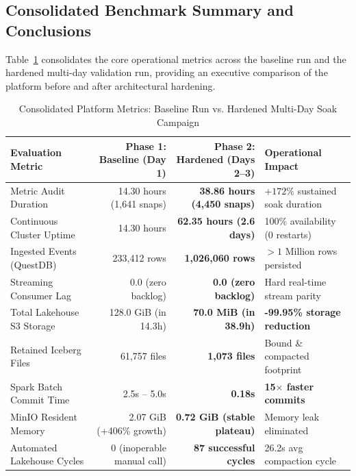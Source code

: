 \subsection{Consolidated Benchmark Summary and Conclusions}
\label{subsec:eval_summary}

Table~\ref{tab:pipeline_consolidated_summary} consolidates the core operational metrics across the baseline run and the hardened multi-day validation run, providing an executive comparison of the platform before and after architectural hardening.

\begin{table}[htbp]
\centering
\small
\caption{Consolidated Platform Metrics: Baseline Run vs. Hardened Multi-Day Soak Campaign}
\label{tab:pipeline_consolidated_summary}
\vspace{0.2cm}
\begin{tabular}{l r r l}
\toprule
\textbf{Evaluation Metric} & \textbf{Phase 1: Baseline (Day 1)} & \textbf{Phase 2: Hardened (Days 2--3)} & \textbf{Operational Impact} \\
\midrule
Metric Audit Duration      & 14.30 hours (1,641 snaps)  & \textbf{38.86 hours (4,450 snaps)}  & $+172\%$ sustained soak duration \\
Continuous Cluster Uptime  & 14.30 hours                & \textbf{62.35 hours (2.6 days)}    & 100\% availability (0 restarts) \\
Ingested Events (QuestDB)  & 233,412 rows               & \textbf{1,026,060 rows}            & $> 1$ Million rows persisted \\
Streaming Consumer Lag     & 0.0 (zero backlog)         & \textbf{0.0 (zero backlog)}        & Hard real-time stream parity \\
Total Lakehouse S3 Storage & 128.0 GiB (in 14.3h)       & \textbf{70.0 MiB (in 38.9h)}       & \textbf{-99.95\% storage reduction} \\
Retained Iceberg Files     & 61,757 files               & \textbf{1,073 files}               & Bound \& compacted footprint \\
Spark Batch Commit Time    & 2.5s -- 5.0s               & \textbf{0.18s}                     & \textbf{15$\times$ faster commits} \\
MinIO Resident Memory      & 2.07 GiB (+406\% growth)   & \textbf{0.72 GiB (stable plateau)} & Memory leak eliminated \\
Automated Lakehouse Cycles & 0 (inoperable manual call) & \textbf{87 successful cycles}      & 26.2s avg compaction cycle \\
\bottomrule
\end{tabular}
\end{table}

